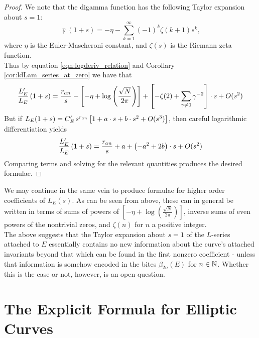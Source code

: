\begin{proof}
We note that the digamma function has the following Taylor expansion about $s=1$:
\begin{equation}
\digamma(1+s) = -\eta - \sum_{k=1}^{\infty} (-1)^k \zeta(k+1) s^k,
\end{equation}
where $\eta$ is the Euler-Mascheroni constant, and $\zeta(s)$ is the Riemann zeta function. \\
Thus by equation \ref{eqn:logderiv_relation} and Corollary \ref{cor:ldLam_series_at_zero} we have that
\begin{equation*}
\frac{L_E^{\prime}}{L_E}\left(1+s\right) = \frac{r_{an}}{s} - \left[-\eta + \log\left(\frac{\sqrt{N}}{2\pi}\right)\right] + \left[-\zeta(2) + \sum_{\gamma\ne0} \gamma^{-2}\right]\cdot s + O(s^2)
\end{equation*}
But if $L_E(1+s) = C_E^{\prime} \, s^{r_{an}}\left[1 + a\cdot s + b\cdot s^2 + O(s^3)\right]$, then careful logarithmic differentiation yields
\begin{equation*}
\frac{L_E^{\prime}}{L_E}\left(1+s\right) = \frac{r_{an}}{s} + a + \left(-a^2 + 2b\right)\cdot s + O(s^2)
\end{equation*}
Comparing terms and solving for the relevant quantities produces the desired formulae.
\end{proof}
We may continue in the same vein to produce formulae for higher order coefficients of $L_E(s)$. As can be seen from above, these can in general be written in terms of sums of powers of $\left[-\eta + \log\left(\frac{\sqrt{N}}{2\pi}\right)\right]$, inverse sums of even powers of the nontrivial zeros, and $\zeta(n)$ for $n$ a positive integer. \\

The above suggests that the Taylor expansion about $s=1$ of the $L$-series attached to $E$ essentially contains no new information about the curve's attached invariants beyond that which can be found in the first nonzero coefficient - unless that information is somehow encoded in the bites $\beta_{2n}(E)$ for $n \in \mathbb{N}$. Whether this is the case or not, however, is an open question.


\newpage
\section{The Explicit Formula for Elliptic Curves}

